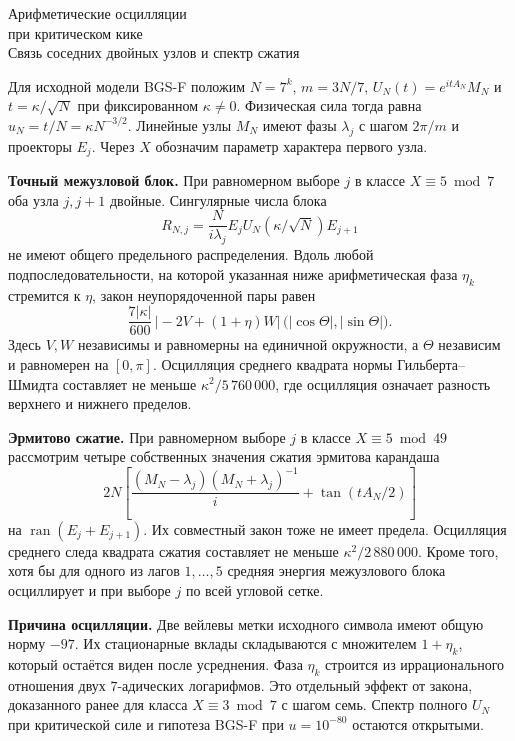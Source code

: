 \documentclass[11pt,a4paper]{article}
\newcommand{\subt}[1]{\par\medskip\noindent\textbf{#1.}\quad}
\begin{document}
\begin{center}{\LARGE\sffamily Арифметические осцилляции\\[2pt]при критическом кике}\\[6pt]
{\large Связь соседних двойных узлов и спектр сжатия}
\end{center}

Для исходной модели BGS-F положим \(N=7^k\), \(m=3N/7\), \(U_N(t)=e^{itA_N}M_N\) и \(t=\kappa/\sqrt N\) при фиксированном \(\kappa\ne0\). Физическая сила тогда равна \(u_N=t/N=\kappa N^{-3/2}\). Линейные узлы \(M_N\) имеют фазы \(\lambda_j\) с шагом \(2\pi/m\) и проекторы \(E_j\). Через \(X\) обозначим параметр характера первого узла.

\subt{Точный межузловой блок}
При равномерном выборе \(j\) в классе \(X\equiv5\bmod7\) оба узла \(j,j+1\) двойные. Сингулярные числа блока
\[
  R_{N,j}=\frac{N}{i\lambda_j}E_j U_N(\kappa/\sqrt N)E_{j+1}
\]
не имеют общего предельного распределения. Вдоль любой подпоследовательности, на которой указанная ниже арифметическая фаза \(\eta_k\) стремится к \(\eta\), закон неупорядоченной пары равен
\[
  \frac{7|\kappa|}{600}\,\bigl|-2V+(1+\eta)W\bigr|\,
  \bigl(|\cos\Theta|,|\sin\Theta|\bigr).
\]
Здесь \(V,W\) независимы и равномерны на единичной окружности, а \(\Theta\) независим и равномерен на \([0,\pi]\). Осцилляция среднего квадрата нормы Гильберта--Шмидта составляет не меньше \(\kappa^2/5\,760\,000\), где осцилляция означает разность верхнего и нижнего пределов.

\subt{Эрмитово сжатие}
При равномерном выборе \(j\) в классе \(X\equiv5\bmod49\) рассмотрим четыре собственных значения сжатия эрмитова карандаша
\[
  2N\!\left[\frac{(M_N-\lambda_j)(M_N+\lambda_j)^{-1}}{i}
              +\tan(tA_N/2)\right]
\]
на \(\operatorname{ran}(E_j+E_{j+1})\). Их совместный закон тоже не имеет предела. Осцилляция среднего следа квадрата сжатия составляет не меньше \(\kappa^2/2\,880\,000\). Кроме того, хотя бы для одного из лагов \(1,\ldots,5\) средняя энергия межузлового блока осциллирует и при выборе \(j\) по всей угловой сетке.

\subt{Причина осцилляции}
Две вейлевы метки исходного символа имеют общую норму \(-97\). Их стационарные вклады складываются с множителем \(1+\eta_k\), который остаётся виден после усреднения. Фаза \(\eta_k\) строится из иррационального отношения двух \(7\)-адических логарифмов. Это отдельный эффект от закона, доказанного ранее для класса \(X\equiv3\bmod7\) с шагом семь. Спектр полного \(U_N\) при критической силе и гипотеза BGS-F при \(u=10^{-80}\) остаются открытыми.
\end{document}
